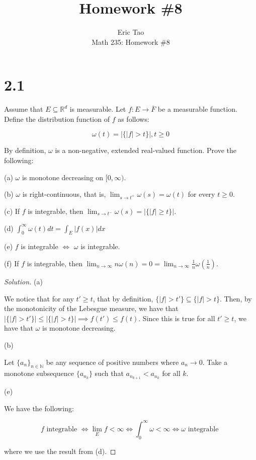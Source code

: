 \documentclass[10pt]{article}
\newenvironment{problem}[2][Problem]{\begin{trivlist}
\item[\hskip \labelsep {\bfseries #1}\hskip \labelsep {\bfseries #2.}]}{\end{trivlist}}
\begin{document}
 
\title{Homework \#8}
\author{Eric Tao\\
Math 235: Homework \#8}
\maketitle
 
\section*{2.1}

\begin{problem}{4.6.21}

Assume that $E \subseteq \mathbb{R}^d$ is measurable. Let $f: E \to \overline{F}$ be a measurable function. Define the distribution function of $f$ as follows:

$$\omega(t) = \left| \{ |f| > t \} \right|, t \geq 0$$

By definition, $\omega$ is a non-negative, extended real-valued function. Prove the following:

(a) $\omega$ is monotone decreasing on $[0,\infty)$.

(b) $\omega$ is right-continuous, that is, $\lim_{s \to t^+} \omega(s) = \omega(t)$ for every $t \geq 0$.

(c) If $f$ is integrable, then $\lim_{s \to t^-} \omega(s) = \left| \{ |f| \geq t \} \right| $.

(d) $\int_0^\infty \omega(t) dt = \int_E |f(x)| dx$

(e) $f$ is integrable $\iff$ $\omega$ is integrable.

(f) If $f$ is integrable, then $\lim_{n \to \infty} n \omega(n) = 0 = \lim_{n \to \infty} \frac{1}{n} \omega(\frac{1}{n})$.

\end{problem}
\begin{proof}[Solution]

(a)

We notice that for any $t' \geq t$, that by definition, $\{ |f| > t' \} \subseteq \{ |f| > t \}$. Then, by the monotonicity of the Lebesgue measure, we have that $|\{ |f| > t' \}| \leq |\{ |f| > t \}| \implies f(t') \leq f(t)$. Since this is true for all $t' \geq t$, we have that $\omega$ is monotone decreasing.

(b) 

Let $\{ a_n \}_{n \in \mathbb{N}}$ be any sequence of positive numbers where $a_n \to 0$. Take a monotone subsequence $\{ a_{n_k} \}$ such that $a_{n_{k+1}} < a_{n_k}$  for all $k$.


(e)

We have the following:

$$ f \text{ integrable } \iff \lim_{E} f < \infty \iff \int_0^\infty \omega < \infty \iff \omega \text{ integrable } $$

where we use the result from (d).

\end{proof}
\end{document}
